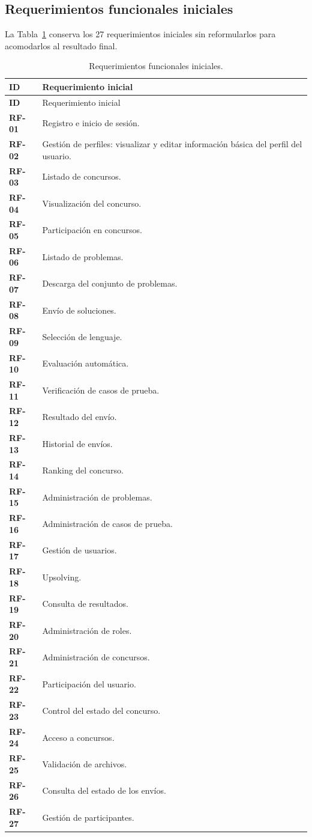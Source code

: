 \documentclass[11pt,a4paper]{article}
\begin{document}
\subsection{Requerimientos funcionales iniciales}
La Tabla~\ref{tab:rf-iniciales} conserva los 27 requerimientos iniciales sin reformularlos para acomodarlos al resultado final.

\begin{longtable}{>{\bfseries}p{1.4cm}p{12.8cm}}
\caption{Requerimientos funcionales iniciales.}\label{tab:rf-iniciales}\\
\toprule
ID & Requerimiento inicial \\
\midrule
\endfirsthead
\toprule
ID & Requerimiento inicial \\
\midrule
\endhead
RF-01 & Registro e inicio de sesión. \\
RF-02 & Gestión de perfiles: visualizar y editar información básica del perfil del usuario. \\
RF-03 & Listado de concursos. \\
RF-04 & Visualización del concurso. \\
RF-05 & Participación en concursos. \\
RF-06 & Listado de problemas. \\
RF-07 & Descarga del conjunto de problemas. \\
RF-08 & Envío de soluciones. \\
RF-09 & Selección de lenguaje. \\
RF-10 & Evaluación automática. \\
RF-11 & Verificación de casos de prueba. \\
RF-12 & Resultado del envío. \\
RF-13 & Historial de envíos. \\
RF-14 & Ranking del concurso. \\
RF-15 & Administración de problemas. \\
RF-16 & Administración de casos de prueba. \\
RF-17 & Gestión de usuarios. \\
RF-18 & Upsolving. \\
RF-19 & Consulta de resultados. \\
RF-20 & Administración de roles. \\
RF-21 & Administración de concursos. \\
RF-22 & Participación del usuario. \\
RF-23 & Control del estado del concurso. \\
RF-24 & Acceso a concursos. \\
RF-25 & Validación de archivos. \\
RF-26 & Consulta del estado de los envíos. \\
RF-27 & Gestión de participantes. \\
\bottomrule
\end{longtable}
\end{document}
